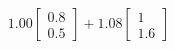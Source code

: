\documentclass[preview]{standalone}
\begin{document}
\begin{align*}
1.00 \begin{bmatrix} 0.8 \\ 0.5 \end{bmatrix} + 1.08 \begin{bmatrix} 1 \\ 1.6 \end{bmatrix}
\end{align*}
\end{document}
